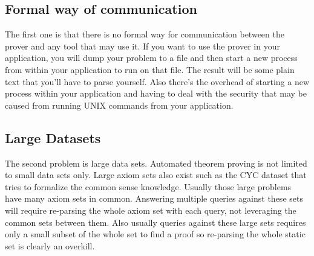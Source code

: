 \subsection{Formal way of communication}
The first one is that there is no formal way for communication between the prover and any tool that may use it. If you want to use the prover in your application, you will dump your problem to a file and then start a new process from within your application to run on that file. The result will be some plain text that you'll have to parse yourself. Also there's the overhead of starting a new process within your application and having to deal with the security that may be caused from running UNIX commands from your application.

\subsection{Large Datasets}
The second problem is large data sets. Automated theorem proving is not limited to small data sets only. Large axiom sets also exist such as the CYC dataset that tries to formalize the common sense knowledge. Usually those large problems have many axiom sets in common. Answering multiple queries against these sets will require re-parsing the whole axiom set with each query, not leveraging the common sets between them. Also usually queries against these large sets requires only a small subset of the whole set to find a proof so re-parsing the whole static set is clearly an overkill.
